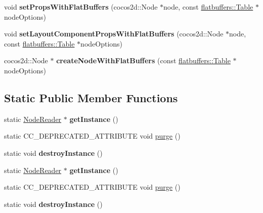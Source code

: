 \begin{DoxyCompactItemize}
\mbox{\label{classcocostudio_1_1NodeReader_ab928c4f5171ad58f5a53ec650873404c}} 
void {\bfseries set\+Props\+With\+Flat\+Buffers} (cocos2d\+::\+Node $\ast$node, const \hyperlink{classflatbuffers_1_1Table}{flatbuffers\+::\+Table} $\ast$node\+Options)
\item 
\mbox{\label{classcocostudio_1_1NodeReader_a87c431a0caa730445329968ea11bfc8b}} 
void {\bfseries set\+Layout\+Component\+Props\+With\+Flat\+Buffers} (cocos2d\+::\+Node $\ast$node, const \hyperlink{classflatbuffers_1_1Table}{flatbuffers\+::\+Table} $\ast$node\+Options)
\item 
\mbox{\label{classcocostudio_1_1NodeReader_a68554e43dbd16d182130fb799c50cd1b}} 
cocos2d\+::\+Node $\ast$ {\bfseries create\+Node\+With\+Flat\+Buffers} (const \hyperlink{classflatbuffers_1_1Table}{flatbuffers\+::\+Table} $\ast$node\+Options)
\end{DoxyCompactItemize}
\subsection*{Static Public Member Functions}
\begin{DoxyCompactItemize}
\item 
\mbox{\label{classcocostudio_1_1NodeReader_acdb2f2403eac9e2a6d3d322e6b32f8ae}} 
static \hyperlink{classcocostudio_1_1NodeReader}{Node\+Reader} $\ast$ {\bfseries get\+Instance} ()
\item 
static C\+C\+\_\+\+D\+E\+P\+R\+E\+C\+A\+T\+E\+D\+\_\+\+A\+T\+T\+R\+I\+B\+U\+TE void \hyperlink{classcocostudio_1_1NodeReader_aac7a33c0697c91ac88c864f81f8813b3}{purge} ()
\item 
\mbox{\label{classcocostudio_1_1NodeReader_a5046f09c65fe716db60e3b8f88d6e455}} 
static void {\bfseries destroy\+Instance} ()
\item 
\mbox{\label{classcocostudio_1_1NodeReader_a8b6f33dd8b025633c5db99be373e582d}} 
static \hyperlink{classcocostudio_1_1NodeReader}{Node\+Reader} $\ast$ {\bfseries get\+Instance} ()
\item 
static C\+C\+\_\+\+D\+E\+P\+R\+E\+C\+A\+T\+E\+D\+\_\+\+A\+T\+T\+R\+I\+B\+U\+TE void \hyperlink{classcocostudio_1_1NodeReader_aac7a33c0697c91ac88c864f81f8813b3}{purge} ()
\item 
\mbox{\label{classcocostudio_1_1NodeReader_ae1b0cef0af243ef07eeee26e3a49cae0}} 
static void {\bfseries destroy\+Instance} ()
\end{DoxyCompactItemize}


